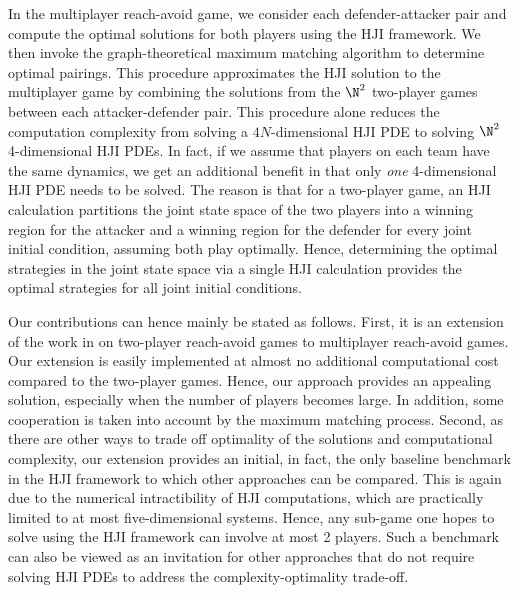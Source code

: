 In the multiplayer reach-avoid game, we consider each defender-attacker pair and compute the optimal solutions for both players using the HJI framework. We then invoke the graph-theoretical maximum matching algorithm  \cite{Schrjiver2004, Karpinski1998} to determine optimal pairings. This procedure approximates the HJI solution to the multiplayer game by combining the solutions from the $\N^2$ two-player games between each attacker-defender pair. This procedure alone reduces the computation complexity from solving a $4N$-dimensional HJI PDE to solving $\N^2$ 4-dimensional HJI PDEs. In fact, if we assume that players on each team have the same dynamics, we get an additional benefit in that only \textit{one} 4-dimensional HJI PDE needs to be solved. The reason is that for a two-player game, an HJI calculation partitions the joint state space of the two players into a winning region for the attacker and a winning region for the defender for every joint initial condition, assuming both play optimally. Hence, determining the optimal strategies in the joint state space via a single HJI calculation provides the optimal strategies for all joint initial conditions.

Our contributions can hence mainly be stated as follows. First, it is an extension of the work in \cite{Huang2011} on two-player reach-avoid games to multiplayer reach-avoid games. Our extension is easily implemented at almost no additional computational cost compared to the two-player games. Hence, our approach provides an appealing solution, especially when the number of players becomes large. In addition, some cooperation is taken into account by the maximum matching process. Second, as there are other ways to trade off optimality of the solutions and computational complexity, our extension provides an initial, in fact, the only baseline benchmark in the HJI framework to which other approaches can be compared. This is again due to the numerical intractibility of HJI computations, which are practically limited to at most five-dimensional systems. Hence, any sub-game one hopes to solve using the HJI framework can involve at most 2 players. Such a benchmark can also be viewed as an invitation for other approaches that do not require solving HJI PDEs to address the complexity-optimality trade-off. 


